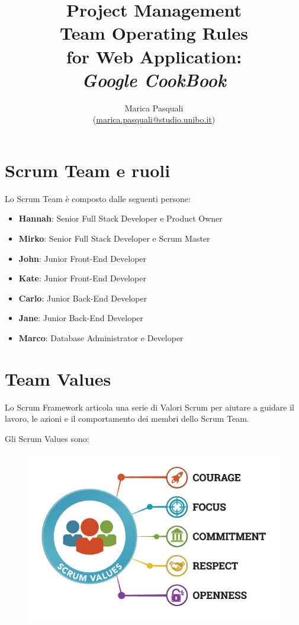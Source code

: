 \documentclass{article}
\title{
    Project Management \\
    \textbf{ 
        Team Operating Rules \\ 
        for Web Application: \\
        \textit{Google CookBook}
    }
}
\author{
    Marica Pasquali \\ 
    (\href{mailto:marica.pasquali@studio.unibo.it}{marica.pasquali@studio.unibo.it})
}
\begin{document}
\maketitle 
\newpage
\tableofcontents 
\newpage

\section{Scrum Team e ruoli}

Lo Scrum Team è composto dalle seguenti persone:

\begin{itemize}
    \item \textbf{Hannah}: Senior Full Stack Developer e Product Owner
    \item \textbf{Mirko}: Senior Full Stack Developer e Scrum Master
    \item \textbf{John}: Junior Front-End Developer
    \item \textbf{Kate}: Junior Front-End Developer
    \item \textbf{Carlo}: Junior Back-End Developer
    \item \textbf{Jane}: Junior Back-End Developer
    \item \textbf{Marco}: Database Administrator e Developer
\end{itemize}

\section{Team Values}

Lo Scrum Framework articola una serie di Valori Scrum per aiutare a guidare il lavoro, le azioni e il comportamento dei membri dello Scrum Team.

Gli Scrum Values sono:

\begin{figure}[h]
    \centering
    \includegraphics[scale=0.4]{./imgs/scrum-values.png}
\end{figure}
\end{document}
